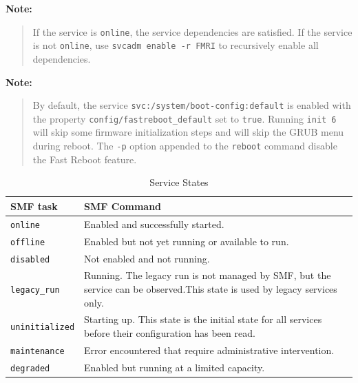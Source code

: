 \documentclass[10pt,a4paper,twoside]{report}
\begin{document}
\textbf{Note:}
\begin{quote}
If the service is \verb+online+, the service dependencies are satisfied. If the service is not \verb+online+, use \verb+svcadm enable -r FMRI+ to recursively enable all dependencies.
\end{quote}

\textbf{Note:}
\begin{quote}
By default, the service \verb+svc:/system/boot-config:default+ is enabled with the property \verb+config/fastreboot_default+ set to \verb+true+. Running \verb+init 6+ will skip some firmware initialization steps and will skip the GRUB menu during reboot. The \verb+-p+ option appended to the \verb+reboot+ command disable the Fast Reboot feature.
\end{quote}

\begin{table}[htbp]
\begin{tabular}{|p{}|p{}|}
\hline
\rowcolor{LightBlue}
 \textbf{SMF task}& \textbf{SMF Command} \\
\hline
\rowcolor{LightYellow}
\verb+online+ & Enabled and successfully started.\\
\hline
\rowcolor{LightYellow}
\verb+offline+ & Enabled but not yet running or available to run.\\
\hline
\rowcolor{LightYellow}
\verb+disabled+ & Not enabled and not running.\\
\hline
\rowcolor{LightYellow}
\verb+legacy_run+ & Running. The legacy run is not managed by SMF, but the service can be observed.This state is used by legacy services only.\\
\hline
\rowcolor{LightYellow}
\verb+uninitialized+ & Starting up. This state is the initial state for all services before their configuration has been read.\\
\hline
\rowcolor{LightYellow}
\verb+maintenance+ & Error encountered that require administrative intervention.\\
\hline
\rowcolor{LightYellow}
\verb+degraded+ & Enabled but running at a limited capacity.\\
\hline
\end{tabular}
\caption{Service States}
\end{table}
\end{document}

